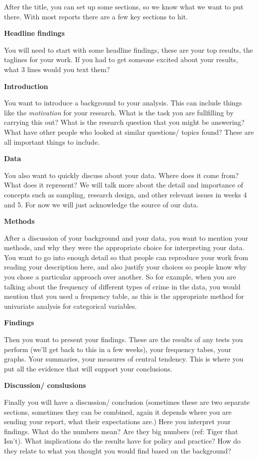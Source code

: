 \documentclass[
]{book}
\begin{document}
After the title, you can set up some sections, so we know what we want to put there. With most reports there are a few key sections to hit.

\textbf{Headline findings}

You will need to start with some headline findings, these are your top results, the taglines for your work. If you had to get someone excited about your results, what 3 lines would you text them?

\textbf{Introduction}

You want to introduce a background to your analysis. This can include things like the \emph{motivation} for your research. What is the task you are fullfilling by carrying this out? What is the research question that you might be answering? What have other people who looked at similar questions/ topics found? These are all important things to include.

\textbf{Data}

You also want to quickly discuss about your data. Where does it come from? What does it represent? We will talk more about the detail and importance of concepts such as sampling, research design, and other relevant issues in weeks 4 and 5. For now we will just acknowledge the source of our data.

\textbf{Methods}

After a discussion of your background and your data, you want to mention your methods, and why they were the appropriate choice for interpreting your data. You want to go into enough detail so that people can reproduce your work from reading your description here, and also justify your choices so people know why you chose a particular approach over another. So for example, when you are talking about the frequency of different types of crime in the data, you would mention that you used a frequency table, as this is the appropriate method for univariate analysis for categorical variables.

\textbf{Findings}

Then you want to present your findings. These are the results of any tests you perform (we'll get back to this in a few weeks), your frequency tabes, your graphs. Your summaries, your measures of central tendency. This is where you put all the evidence that will support your conclusions.

\textbf{Discussion/ conslusions}

Finally you will have a discussion/ conclusion (sometimes these are two separate sections, sometimes they can be combined, again it depends where you are sending your report, what their expectations are.) Here you interpret your findings. What do the numbers mean? Are they big numbers (ref: Tiger that Isn't). What implications do the results have for policy and practice? How do they relate to what you thought you would find based on the background?
\end{document}
